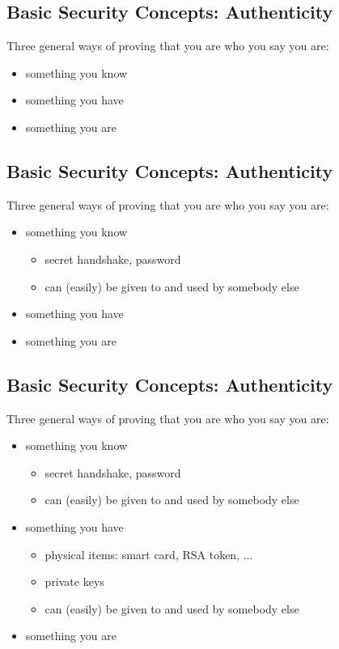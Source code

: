 \documentclass[xga]{xdvislides}
\begin{document}
\subsection{Basic Security Concepts: Authenticity}
Three general ways of proving that you are who you say you are:
\begin{itemize}
	\item something you know
	\item something you have
	\item something you are
\end{itemize}

\subsection{Basic Security Concepts: Authenticity}
Three general ways of proving that you are who you say you are:
\begin{itemize}
	\item something you know
		\begin{itemize}
			\item secret handshake, password
			\item can (easily) be given to and used by somebody else
		\end{itemize}
	\item something you have
	\item something you are
\end{itemize}

\subsection{Basic Security Concepts: Authenticity}
Three general ways of proving that you are who you say you are:
\begin{itemize}
	\item something you know
		\begin{itemize}
			\item secret handshake, password
			\item can (easily) be given to and used by somebody else
		\end{itemize}
	\item something you have
		\begin{itemize}
			\item physical items: smart card, RSA token, ...
			\item private keys
			\item can (easily) be given to and used by somebody else
		\end{itemize}
	\item something you are
\end{itemize}
\end{document}
